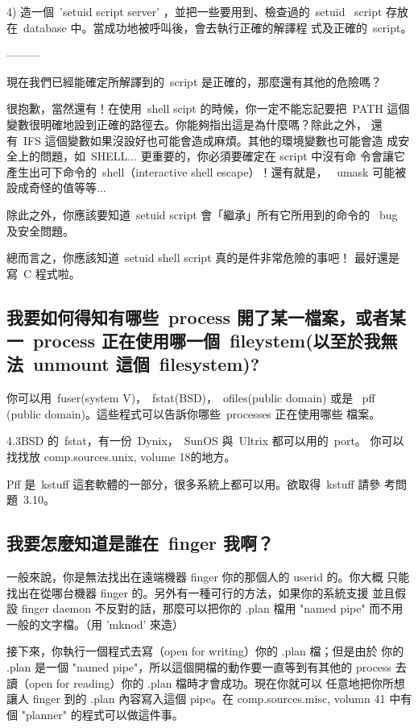\documentclass{article}
\begin{document}
\begin{CJK*}{Bg5}{ming}
	4)  造一個~'setuid script server' ，並把一些要用到、檢查過的~setuid 
           ~script 存放在~database 中。當成功地被呼叫後，會去執行正確的解譯程
            式及正確的~script。

        ---------

	現在我們已經能確定所解譯到的~script 是正確的，那麼還有其他的危險嗎？

	很抱歉，當然還有！在使用~shell scipt 的時候，你一定不能忘記要把~PATH 
        這個變數很明確地設到正確的路徑去。你能夠指出這是為什麼嗎？除此之外，
        還有~IFS 這個變數如果沒設好也可能會造成麻煩。其他的環境變數也可能會造
        成安全上的問題，如~SHELL... 更重要的，你必須要確定在 script 中沒有命
        令會讓它產生出可下命令的~shell（interactive shell escape）！還有就是，
       ~umask 可能被設成奇怪的值等等...

	除此之外，你應該要知道~setuid script 會「繼承」所有它所用到的命令的 
       ~bug 及安全問題。

	總而言之，你應該知道~setuid shell script 真的是件非常危險的事吧！
        最好還是寫~C 程式啦。

\subsection{我要如何得知有哪些~process 開了某一檔案，或者某一~process 
	正在使用哪一個~fileystem(以至於我無法~unmount 這個~filesystem)?}

	你可以用~fuser(system V)，~fstat(BSD)，~ofiles(public domain) 或是
	~pff (public domain)。這些程式可以告訴你哪些~processes 正在使用哪些
	檔案。

	4.3BSD 的~fstat，有一份~Dynix，~SunOS 與~Ultrix 都可以用的~port。
	你可以找找放 comp.sources.unix, volume 18的地方。

	Pff 是~kstuff 這套軟體的一部分，很多系統上都可以用。欲取得~kstuff 請參
        考問題~3.10。

\subsection{我要怎麼知道是誰在~finger 我啊？}

	一般來說，你是無法找出在遠端機器 finger 你的那個人的 userid 的。你大概
        只能找出在從哪台機器 finger 的。另外有一種可行的方法，如果你的系統支援
        並且假設 finger daemon 不反對的話，那麼可以把你的 .plan 檔用 "named 
        pipe" 而不用一般的文字檔。（用 'mknod' 來造）

	接下來，你執行一個程式去寫（open for writing）你的 .plan 檔；但是由於
        你的 .plan 是一個 "named pipe"，所以這個開檔的動作要一直等到有其他的 
	process 去讀（open for reading）你的 .plan 檔時才會成功。現在你就可以
        任意地把你所想讓人 finger 到的 .plan 內容寫入這個 pipe。在 
        comp.sources.misc, volumn 41 中有個 "planner" 的程式可以做這件事。


\end{CJK*}
\end{document}
